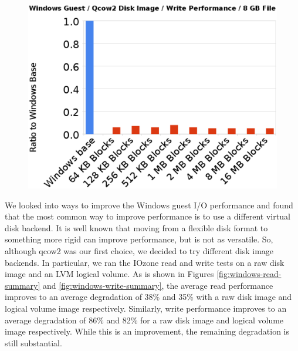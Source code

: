 \begin{figure}[tbp]
\begin{centering}
\label{fig:windows-write}
\includegraphics[scale=.7,angle=90]{figs/windows-write}
\end{centering}
\end{figure}

We looked into ways to improve the Windows guest I/O performance and found that the most common way to improve performance is to use a different virtual disk backend. It is well known that moving from a flexible disk format to something more rigid can improve performance, but is not as versatile. So, although qcow2 was our first choice, we decided to try different disk image backends. In particular, we ran the IOzone read and write tests on a raw disk image and an LVM logical volume. As is shown in Figures \ref{fig:windows-read-summary} and \ref{fig:windows-write-summary}, the average read performance improves to an average degradation of 38\% and 35\% with a raw disk image and logical volume image respectively. Similarly, write performance improves to an average degradation of 86\% and 82\% for a raw disk image and logical volume image respectively. While this is an improvement, the remaining degradation is still substantial.

